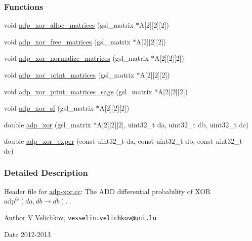 \subsubsection*{\-Functions}
\begin{DoxyCompactItemize}
\item 
void \hyperlink{adp-xor_8hh_a23d0b0f04de73d2272f94a2f4bf4d268}{adp\-\_\-xor\-\_\-alloc\-\_\-matrices} (gsl\-\_\-matrix $\ast$\-A\mbox{[}2\mbox{]}\mbox{[}2\mbox{]}\mbox{[}2\mbox{]})
\item 
void \hyperlink{adp-xor_8hh_a4a822cd164af30e0fa8bfe3eadb9dbde}{adp\-\_\-xor\-\_\-free\-\_\-matrices} (gsl\-\_\-matrix $\ast$\-A\mbox{[}2\mbox{]}\mbox{[}2\mbox{]}\mbox{[}2\mbox{]})
\item 
void \hyperlink{adp-xor_8hh_a4c50572f657100b1e5d33a433c148a86}{adp\-\_\-xor\-\_\-normalize\-\_\-matrices} (gsl\-\_\-matrix $\ast$\-A\mbox{[}2\mbox{]}\mbox{[}2\mbox{]}\mbox{[}2\mbox{]})
\item 
void \hyperlink{adp-xor_8hh_a90322676fddee1876f0cd42e53e294e5}{adp\-\_\-xor\-\_\-print\-\_\-matrices} (gsl\-\_\-matrix $\ast$\-A\mbox{[}2\mbox{]}\mbox{[}2\mbox{]}\mbox{[}2\mbox{]})
\item 
void \hyperlink{adp-xor_8hh_a279df9bc30e67dd7cf27e1b926cbd9c2}{adp\-\_\-xor\-\_\-print\-\_\-matrices\-\_\-sage} (gsl\-\_\-matrix $\ast$\-A\mbox{[}2\mbox{]}\mbox{[}2\mbox{]}\mbox{[}2\mbox{]})
\item 
void \hyperlink{adp-xor_8hh_a42dda78d01cbb1a68263d971c1ab63ea}{adp\-\_\-xor\-\_\-sf} (gsl\-\_\-matrix $\ast$\-A\mbox{[}2\mbox{]}\mbox{[}2\mbox{]}\mbox{[}2\mbox{]})
\item 
double \hyperlink{adp-xor_8hh_ac720722a292fc8bb277b751e0b0be072}{adp\-\_\-xor} (gsl\-\_\-matrix $\ast$\-A\mbox{[}2\mbox{]}\mbox{[}2\mbox{]}\mbox{[}2\mbox{]}, uint32\-\_\-t da, uint32\-\_\-t db, uint32\-\_\-t dc)
\item 
double \hyperlink{adp-xor_8hh_ae0ed5c441b6eae025518787a1e2ff7a1}{adp\-\_\-xor\-\_\-exper} (const uint32\-\_\-t da, const uint32\-\_\-t db, const uint32\-\_\-t dc)
\end{DoxyCompactItemize}


\subsubsection{\-Detailed \-Description}
\-Header file for \hyperlink{adp-xor_8cc}{adp-\/xor.\-cc}\-: \-The \-A\-D\-D differential probability of \-X\-O\-R $\mathrm{adp}^{\oplus}(da,db \rightarrow db)$. . \begin{DoxyAuthor}{\-Author}
\-V.\-Velichkov, \href{mailto:vesselin.velichkov@uni.lu}{\tt vesselin.\-velichkov@uni.\-lu} 
\end{DoxyAuthor}
\begin{DoxyDate}{\-Date}
2012-\/2013 
\end{DoxyDate}


